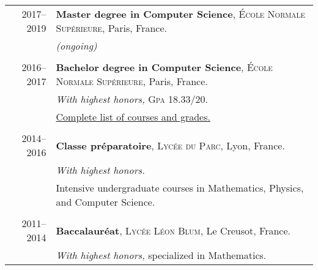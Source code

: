 \documentclass[a4paper,10pt]{article} %
\begin{document}
\begin{tabular}{r|l}	
  2017--2019 & \textbf{Master degree in Computer Science}, \textsc{\'Ecole Normale Supérieure}, Paris, France.\\
             & \emph{(ongoing)}\\
\multicolumn{2}{c}{} \\

  2016--2017 & \textbf{Bachelor degree in Computer Science}, \textsc{\'Ecole Normale Supérieure}, Paris, France.\\
             & \emph{With highest honors,} \textsc{Gpa} 18.33/20. \\
             & \hyperlink{notes}{Complete list of courses and grades.} \\
\multicolumn{2}{c}{} \\

  2014--2016 & \textbf{Classe préparatoire}, \textsc{Lycée du Parc}, Lyon, France. \\
             & \emph{With highest honors.} \\
             & Intensive undergraduate courses in Mathematics, Physics, and Computer Science.\\
\multicolumn{2}{c}{} \\

  2011--2014 & \textbf{Baccalauréat}, \textsc{Lycée Léon Blum}, Le Creusot, France. \\
             & \emph{With highest honors,} specialized in Mathematics. \\






\end{tabular}
\end{document}
